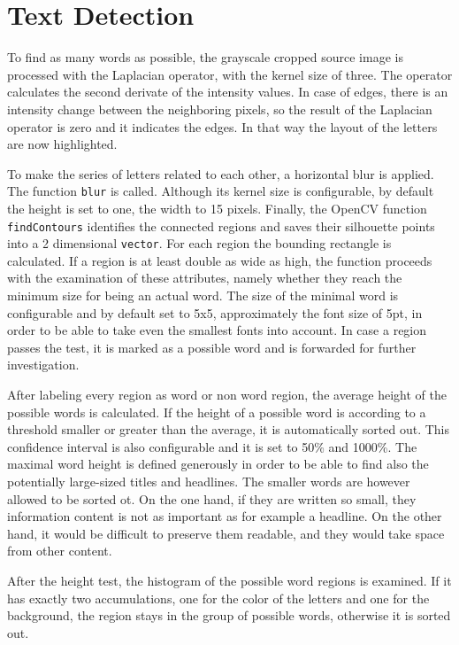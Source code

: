 \documentclass[draft,final]{vutinfth} %
\begin{document}
	\section{Text Detection}
	To find as many words as possible, the grayscale cropped source image is processed with the Laplacian operator, with the kernel size of three.
	The operator calculates the second derivate of the intensity values.
	In case of edges, there is an intensity change between the neighboring pixels, so the result of the Laplacian operator is zero and it indicates the edges.
	In that way the layout of the letters are now highlighted.\par 
	To make the series of letters related to each other, a horizontal blur is applied.
	The function \texttt{blur} is called. 
	Although its kernel size is configurable, by default the height is set to one, the width to 15 pixels. 
	Finally, the OpenCV function  \texttt{findContours} identifies the connected regions and saves their silhouette points into a 2 dimensional \texttt{vector}.
	For each region the bounding rectangle is calculated.
	If a region is at least double as wide as high, the function proceeds with the examination of these attributes, namely whether they reach the minimum size for being an actual word.
	The size of the minimal word is configurable and by default set to 5x5, approximately the font size of 5pt, in order to be able to take even the smallest fonts into account.
	In case a region passes the test, it is marked as a possible word and is forwarded for further investigation.\par 
	After labeling every region as word or non word region, the average height of the possible words is calculated.
	If the height of a possible word is according to a threshold smaller or greater than the average, it is automatically sorted out.
	This confidence interval is also configurable and it is set to 50\% and 1000\%. 
	The maximal word height is defined generously in order to be able to find also the potentially large-sized titles and headlines.
	The smaller words are however allowed to be sorted ot.
	On the one hand, if they are written so small, they information content is not as important as for example a headline.
	On the other hand, it would be difficult to preserve them readable, and they would take space from other content.\par 
	After the height test, the histogram of the possible word regions is examined.
	If it has exactly two accumulations, one for the color of the letters and one for the background, the region stays in the group of possible words, otherwise it is sorted out.\par
\end{document}
